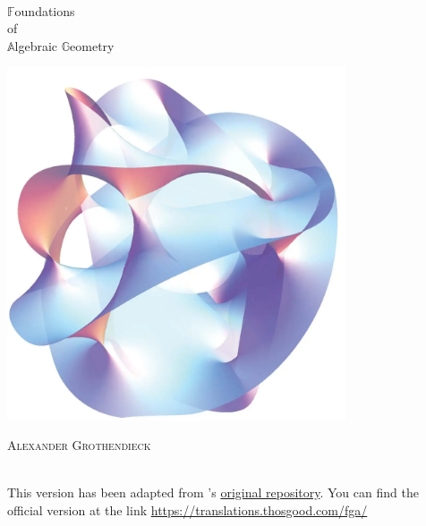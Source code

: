 
$ $

\vfill

\begin{center}
\thispagestyle{empty}

{\Huge \mdseries {}\selectfont
$\mathbb{F}$oundations}\\
\vspace{1em}
{\huge of}\\
\vspace{1em}
{\Huge \mdseries {}\selectfont
$\mathbb{A}$lgebraic $\mathbb{G}$eometry}

\vfill

\includegraphics[width=0.75\textwidth]{book/media/logo.png}

\vfill


\textsc{Alexander Grothendieck}\\
~\\

\vfill

This version has been adapted from \adaptername's \href{https://github.com/thosgood/fga/}{original repository}. You can find the official version at the link
\url{https://translations.thosgood.com/fga/}
\iforiginal{\\
\url{\bookurl}}
\end{center}